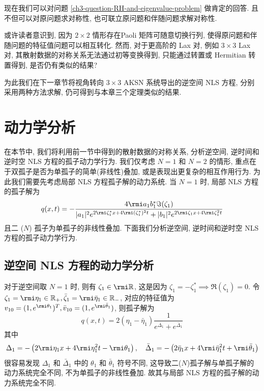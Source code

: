 现在我们可以对问题 \ref{ch3-question-RH-and-eigenvalue-problem} 做肯定的回答. 且不但可以对原问题求对称性, 也可联立原问题和伴随问题求解对称性.

或许读者意识到, 因为 $2 \times 2$ 情形存在Paoli 矩阵可随意切换行列, 使得原问题和伴随问题的特征值问题可以相互转化. 然而, 对于更高阶的 Lax 对, 例如 $3 \times 3$ Lax 对, 其散射数据的对称关系无法通过初等变换得到, 只能通过转置或 Hermitian 转置得到, 是否仍有类似的结果?

为此我们在下一章节将视角转向 $3\times 3$ AKSN 系统导出的逆空间 NLS 方程, 分别采用两种方法求解, 仍可得到与本章三个定理类似的结果.

\section{动力学分析}
在本节中, 我们将利用前一节中得到的散射数据的对称关系, 分析逆空间, 逆时间和逆时空 NLS 方程的孤子动力学行为. 我们仅考虑 $ N = 1 $ 和 $ N = 2 $ 的情形, 重点在于双孤子是否为单孤子的简单(非线性)叠加, 或是表现出更复杂的相互作用行为. 为此我们需要先考虑局部 NLS 方程孤子解的动力系统. 当 $N=1$ 时, 局部 NLS 方程的孤子解为
\begin{equation}
    q(x,t) = -\frac{4 \rmi a_{1} b_{1}^*\Im(\zeta_{1})}{|a_{1}|^{2} e^{2 \rmi \zeta^{*}_{1}x + 4 \rmi (\zeta_{1}^{*})^2 t} + |b_{1}|^{2} e^{2 \rmi \zeta_{1}x + 4 \rmi \zeta_{1}^{2}t}}
\end{equation}
且二 ($N$) 孤子为单孤子的非线性叠加. 下面我们分析逆空间, 逆时间和逆时空 NLS 方程的孤子动力学行为.
\subsection{逆空间 NLS 方程的动力学分析}
对于逆空间取 $N=1$ 时, 则有 $\zeta_{1} \in \rmi \mathbb{R} $, 这是因为 $\zeta_{1} = -\zeta_{1}^{*} \implies \Re(\zeta_{1}) = 0 $. 令 $\zeta_{1} = \rmi \eta_{1} \in \mathbb{R}_{+}, \bar{\zeta}_{1} = \rmi \bar{\eta}_{1} \in \mathbb{R}_{-} $, 对应的特征值为 $v_{10} = (1, e^{\rmi \theta_{1}})^{T}, \bar{v}_{10} = (1, e^{\rmi \bar{\theta}_{1}}) $, 则孤子解为
\begin{equation}
    q(x,t) = 2(\eta_{1} - \bar{\eta}_{1})\frac{1}{e^{\Delta_{1}} + e^{\bar{\Delta}_{1}}}
\end{equation}
其中 \begin{equation}
    \Delta_{1} = -\left(2 \rmi \eta_{1}x + 4 \rmi \eta_{1}^{2} t - \rmi \theta_{1}\right), \quad \bar{\Delta}_{1} = -\left(2 \bar{\eta}_{1} x + 4 \rmi \bar{\eta}_{1}^{2} t + \rmi \bar{\theta}_{1}\right)
\end{equation}
很容易发现 $\Delta_{1}$ 和 $\bar{\Delta}_{1} $ 中的 $\theta_{1} $ 和 $\bar{\theta}_{1}$ 符号不同, 这导致二($N$)孤子解与单孤子解的动力系统完全不同, 不为单孤子的非线性叠加. 故其与局部 NLS 方程的孤子解的动力系统完全不同.

